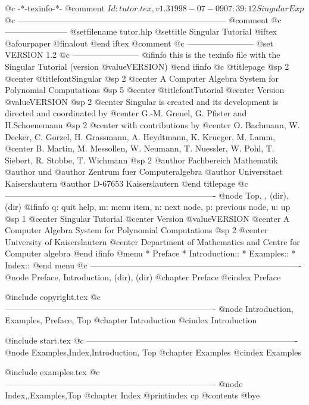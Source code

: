     @c -*-texinfo-*-
@comment $Id: tutor.tex,v 1.3 1998-07-09 07:39:12 Singular Exp $
@c ---------------------------------------------------------------------------
@comment %
@c -----------------------
@setfilename tutor.hlp
@settitle Singular Tutorial
@iftex
@afourpaper
@finalout
@end iftex
@comment %
@c ------------------------
@set VERSION 1.2
@c ------------------------
@ifinfo
this is the texinfo file with the Singular Tutorial (version @value{VERSION})
@end ifinfo
@c
@titlepage
@sp 2
@center @titlefont{Singular}
@sp 2
@center A Computer Algebra System for Polynomial Computations
@sp 5
@center @titlefont{Tutorial}
@center Version @value{VERSION}
@sp 2
@center Singular is created and its development is directed and coordinated by
@center G.-M. Greuel, G. Pfister and H.Schoenemann
@sp 2
@center with contributions by
@center O. Bachmann, W. Decker, C. Gorzel, H. Grassmann, A. Heydtmann, K. Krueger, M. Lamm,
@center B. Martin, M. Messollen, W. Neumann, T. Nuessler, W. Pohl, T. Siebert, R. Stobbe, T. Wichmann
@sp 2
@author Fachbereich Mathematik
@author und
@author Zentrum fuer Computeralgebra
@author Universitaet Kaiserslautern
@author D-67653 Kaiserslautern
@end titlepage
@c ----------------------------------------------------------------------------
@node    Top, ,    (dir),    (dir)
@ifinfo
q: quit help, m: menu item, n: next node, p: previous node, u: up
@sp 1
@center Singular Tutorial
@center Version @value{VERSION}
@center A Computer Algebra System for Polynomial Computations
@sp 2
@center University of Kaiserslautern
@center Department of Mathematics and Centre for Computer algebra
@end ifinfo
@menu
* Preface
* Introduction::
* Examples::
* Index::
@end menu
@c ----------------------------------------------------------------------------
@node Preface, Introduction, (dir),  (dir)
@chapter Preface
@cindex Preface

@include copyright.tex
@c ----------------------------------------------------------------------------
@node Introduction, Examples, Preface, Top
@chapter Introduction
@cindex Introduction

@include start.tex
@c ----------------------------------------------------------------------------
@node Examples,Index,Introduction, Top
@chapter Examples
@cindex Examples

@include examples.tex
@c ----------------------------------------------------------------------------
@node Index,,Examples,Top
@chapter Index
@printindex cp
@contents
@bye
